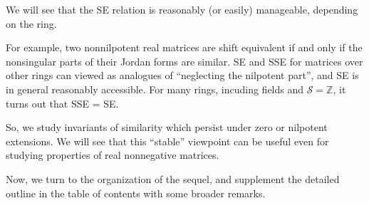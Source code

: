 \documentclass{amsart}
\newcommand{\si}{\index}
\theoremstyle{definition}
\theoremstyle{definition}
\newcommand{\red}[1]{\textcolor{red}{#1}}
\newcommand{\Z}{\mathbb Z}
\numberwithin{equation}{subsection}
\begin{document}
We will see that the SE relation is reasonably (or easily)
manageable, depending on the ring.

For example, two nonnilpotent real matrices are shift equivalent
if and only if the nonsingular parts
of their Jordan forms are similar.
SE and SSE for matrices over other rings can viewed as
analogues of ``neglecting the nilpotent part'', and
SE is in general reasonably accessible.
          For many rings, incuding fields and
 $\mathcal S=\Z$,           it turns out that SSE = SE.

          \fi


          So, we study invariants
of similarity which persist under zero or nilpotent extensions.
We will see that this ``stable'' viewpoint
 can  be useful even for studying
 properties of real nonnegative matrices.

 Now, we turn to the organization of the sequel, and
supplement
 the detailed outline in
 the table of contents with some broader remarks.





\end{document}
